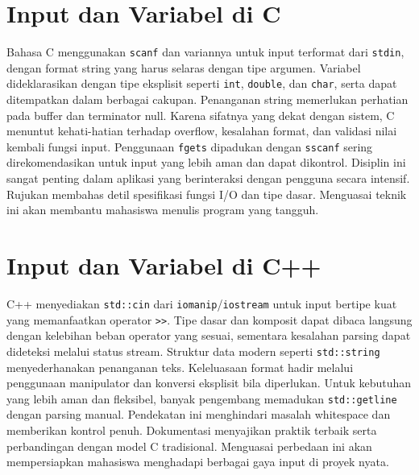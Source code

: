 \documentclass[../main.tex]{subfiles}
\begin{document}
\section{Input dan Variabel di C}
Bahasa C menggunakan \texttt{scanf} dan variannya untuk input terformat dari \texttt{stdin}, dengan format string yang harus selaras dengan tipe argumen. Variabel dideklarasikan dengan tipe eksplisit seperti \texttt{int}, \texttt{double}, dan \texttt{char}, serta dapat ditempatkan dalam berbagai cakupan. Penanganan string memerlukan perhatian pada buffer dan terminator null.
Karena sifatnya yang dekat dengan sistem, C menuntut kehati-hatian terhadap overflow, kesalahan format, dan validasi nilai kembali fungsi input. Penggunaan \texttt{fgets} dipadukan dengan \texttt{sscanf} sering direkomendasikan untuk input yang lebih aman dan dapat dikontrol. Disiplin ini sangat penting dalam aplikasi yang berinteraksi dengan pengguna secara intensif.
Rujukan \textcite{gnu-c-manual,iso-c-draft-n1570} membahas detil spesifikasi fungsi I/O dan tipe dasar. Menguasai teknik ini akan membantu mahasiswa menulis program yang tangguh.

\section{Input dan Variabel di C++}
C++ menyediakan \texttt{std::cin} dari \texttt{iomanip}/\texttt{iostream} untuk input bertipe kuat yang memanfaatkan operator \texttt{>>}. Tipe dasar dan komposit dapat dibaca langsung dengan kelebihan beban operator yang sesuai, sementara kesalahan parsing dapat dideteksi melalui status stream. Struktur data modern seperti \texttt{std::string} menyederhanakan penanganan teks.
Keleluasaan format hadir melalui penggunaan manipulator dan konversi eksplisit bila diperlukan. Untuk kebutuhan yang lebih aman dan fleksibel, banyak pengembang memadukan \texttt{std::getline} dengan parsing manual. Pendekatan ini menghindari masalah whitespace dan memberikan kontrol penuh.
Dokumentasi \textcite{cplusplus-io,cpp-reference} menyajikan praktik terbaik serta perbandingan dengan model C tradisional. Menguasai perbedaan ini akan mempersiapkan mahasiswa menghadapi berbagai gaya input di proyek nyata.
\end{document}

